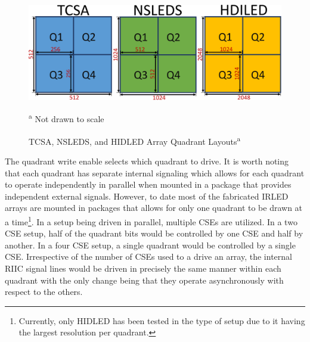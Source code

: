     \begin{figure}
        \centering
        \includegraphics[width=1.0\textwidth]{fig/tcsa_nsleds_hdiled_quads.pdf}
        \caption[TCSA, NSLEDS, and HIDLED Array Quadrant Layouts]{TCSA, NSLEDS, and HIDLED Array Quadrant Layouts\textsuperscript{a}}
        \vspace{-8px}
        \footnotesize\textsuperscript{a} Not drawn to scale
        \label{fig:tcsa_nsleds_hdiled_quads}
    \end{figure}

    The quadrant write enable selects which quadrant to drive. It is worth noting that each quadrant has separate internal signaling which allows for each quadrant to operate independently in parallel when mounted in a package that provides independent external signals. However, to date most of the fabricated IRLED arrays are mounted in packages that allows for only one quadrant to be drawn at a time\footnote{Currently, only HIDLED has been tested in the type of setup\cite{lassiter1, LassiterEtAl2019_1, LassiterEtAl2019_2, lassiter3} due to it having the largest resolution per quadrant.}. In a setup being driven in parallel, multiple CSEs are utilized. In a two CSE setup, half of the quadrant bits would be controlled by one CSE and half by another. In a four CSE setup, a single quadrant would be controlled by a single CSE. Irrespective of the number of CSEs used to a drive an array, the internal RIIC signal lines would be driven in precisely the same manner within each quadrant with the only change being that they operate asynchronously with respect to the others.

